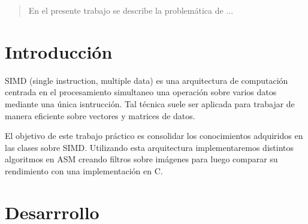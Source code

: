 \documentclass[a4paper]{article}
\begin{document}
\thispagestyle{empty}

\maketitle
\newpage

\thispagestyle{empty}
\vfill
\begin{abstract}
En el presente trabajo se describe la problemática de ...
\end{abstract}

\thispagestyle{empty}
\vspace{3cm}
\tableofcontents
\newpage


\newpage

\section{Introducción}

SIMD (single instruction, multiple data) es una arquitectura de computaci\'on centrada en el procesamiento simultaneo una operaci\'on sobre varios datos mediante una \'unica isntrucci\'on. Tal t\'ecnica suele ser aplicada para trabajar de manera eficiente sobre vectores y matrices de datos. \par
El objetivo de este trabajo pr\'actico es consolidar los conocimientos adquiridos en las clases sobre SIMD. Utilizando esta arquitectura implementaremos distintos algoritmos en ASM creando filtros sobre imágenes para luego comparar su rendimiento con una implementación en C.


\section{Desarrrollo}
\end{document}
